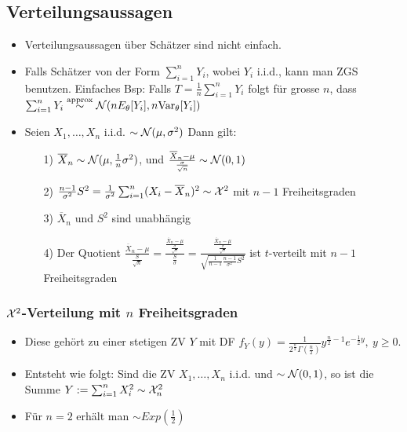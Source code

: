 \subsection{Verteilungsaussagen}
\begin{itemize}
    \item Verteilungsaussagen über Schätzer sind nicht einfach.
    \item Falls Schätzer von der Form $\sum_{i=1}^{n} Y_i$, wobei $Y_i$ i.i.d., kann man ZGS benutzen. Einfaches Bsp: Falls $T = \frac{1}{n} \sum_{i=1}^{n} Y_i$ folgt für grosse $n$, dass $\sum_{i=1}^{n} Y_i \overset{\text{approx}}{\sim} \mathcal{N}(n E_\theta[Y_i], n \text{Var}_\theta[Y_i])$
    \item Seien $X_1, \dots, X_n$ i.i.d. $\sim \mathcal{N}(\mu, \sigma^2)$ Dann gilt:
        \begin{itemize}
            \item[1)] $\overline{X}_n \sim \mathcal{N}(\mu, \frac{1}{n} \sigma^2)$, und $\frac{\overline{X}_n - \mu}{\frac{\sigma}{\sqrt{n}}} \sim \mathcal{N}(0, 1)$
            \item[2)] $\frac{n - 1}{\sigma^2}S^2 = \frac{1}{\sigma^2}\sum_{i=1}^{n} (X_i - \overline{X}_n)^2 \sim \mathcal{X}^2$ mit $n - 1$ Freiheitsgraden
            \item[3)] $\overline{X}_n$ und $S^2$ sind unabhängig
            \item[4)] Der Quotient $\frac{\overline{X}_n - \mu}{\frac{S}{\sqrt{n}}} = \frac{\frac{\overline{X}_n - \mu}{\frac{\sigma}{\sqrt{n}}}}{\frac{S}{\sigma}} = \frac{\frac{\overline{X}_n - \mu}{\frac{\sigma}{\sqrt{n}}}}{\sqrt{\frac{1}{n - 1}\frac{n - 1}{\sigma^2}S^2}}$ ist $t$-verteilt mit $n - 1$ Freiheitsgraden
        \end{itemize}
\end{itemize}

\subsubsection{$\mathcal{X}^2$-Verteilung mit $n$ Freiheitsgraden}
\begin{itemize}
    \item Diese gehört zu einer stetigen ZV $Y$ mit DF $f_Y(y) = \frac{1}{2^{\frac{n}{2}} \Gamma(\frac{n}{2})}y^{\frac{n}{2} - 1}e^{-\frac{1}{2}y}, \ y \ge 0$.
    \item Entsteht wie folgt: Sind die ZV $X_1, \dots, X_n$ i.i.d. und $\sim \mathcal{N}(0, 1)$, so ist die Summe $Y := \sum_{i=1}^{n} X_i^2 \sim \mathcal{X}_n^2$
    \item Für $n = 2$ erhält man $\sim Exp(\frac{1}{2})$
\end{itemize}

